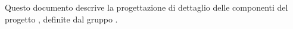 Questo documento descrive la progettazione di dettaglio delle componenti del progetto \progetto, definite dal gruppo \gruppo.
